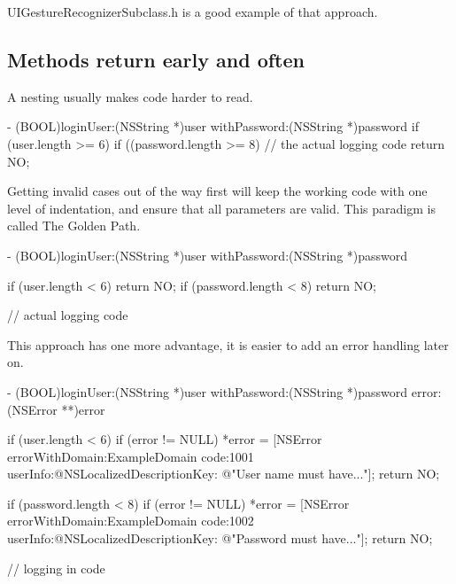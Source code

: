 \documentclass[10pt]{extarticle}
\newenvironment{codelisting}
{\footnotesize\mdframed[middlelinewidth=0.5pt, middlelinecolor=BaliHaiColor, skipabove=15pt]\verbatim}
{\endverbatim\endmdframed\vspace{12pt}\normalsize}
\newenvironment{tiplisting}
{\small\mdframed[middlelinewidth=0.5pt, middlelinecolor=GoldenDreamColor, skipabove=15pt]{\textbf{Tip:}}}
{\endmdframed\vspace{12pt}\normalsize}
\begin{document}
\begin{tiplisting}
UIGestureRecognizerSubclass.h is a good example of that approach.
\end{tiplisting}


\subsection{Methods return early and often}

A nesting usually makes code harder to read.

\begin{codelisting}
- (BOOL)loginUser:(NSString *)user withPassword:(NSString *)password
{
    if (user.length >= 6) {
        if ((password.length >= 8) {
            // the actual logging code
        }
    }
    return NO;
}
\end{codelisting}

Getting invalid cases out of the way first will keep the working code with one level of indentation, and ensure that all parameters are valid. This paradigm is called The Golden Path.

\begin{codelisting}
- (BOOL)loginUser:(NSString *)user withPassword:(NSString *)password
{
    if (user.length < 6) return NO;
    if (password.length < 8) return NO;
    
    // actual logging code
}
\end{codelisting}

This approach has one more advantage, it is easier to add an error handling later on.

\begin{codelisting}
- (BOOL)loginUser:(NSString *)user withPassword:(NSString *)password error:(NSError **)error
{
    if (user.length < 6) {
        if (error != NULL)
            *error = [NSError errorWithDomain:ExampleDomain
                                         code:1001
                                     userInfo:@{NSLocalizedDescriptionKey: @"User name must have..."}];
        return NO;
    }
    
    if (password.length < 8) {
        if (error != NULL)
            *error = [NSError errorWithDomain:ExampleDomain
                                         code:1002
                                     userInfo:@{NSLocalizedDescriptionKey: @"Password must have..."}];
        return NO;
    }
    
    // logging in code
}
\end{codelisting}
\end{document}

